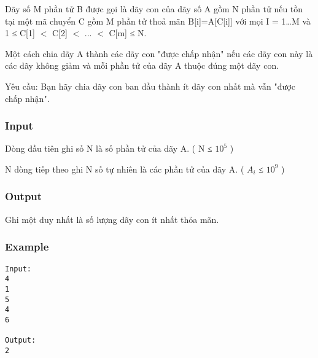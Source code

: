 



   Dãy số M phần tử B được gọi là dãy con của dãy số A gồm N phần tử nếu tồn tại một mã chuyển C gồm M phần tử thoả mãn B[i]=A[C[i]] với mọi I = 1…M và 1 ≤ C[1] $<$ C[2] $<$ ... $<$ C[m] ≤ N.  

   Một cách chia dãy A thành các dãy con "được chấp nhận" nếu các dãy con này là các dãy không giảm và mỗi phần tử của dãy A thuộc đúng một dãy con.  

   Yêu cầu: Bạn hãy chia dãy con ban đầu thành ít dãy con nhất mà vẫn "được chấp nhận".  

\subsubsection{   Input  }

   Dòng đầu tiên ghi số N là số phần tử của dãy A. ( N ≤ $10^{5}$   )  

   N dòng tiếp theo ghi N số tự nhiên là các phần tử của dãy A. (  $A_{i}$   ≤ $10^{9}$   )  

\subsubsection{   Output  }

   Ghi một duy nhất là số lượng dãy con ít nhất thỏa mãn.  

\subsubsection{   Example  }
\begin{verbatim}
Input:
4
1
5
4
6

Output:
2

\end{verbatim}
